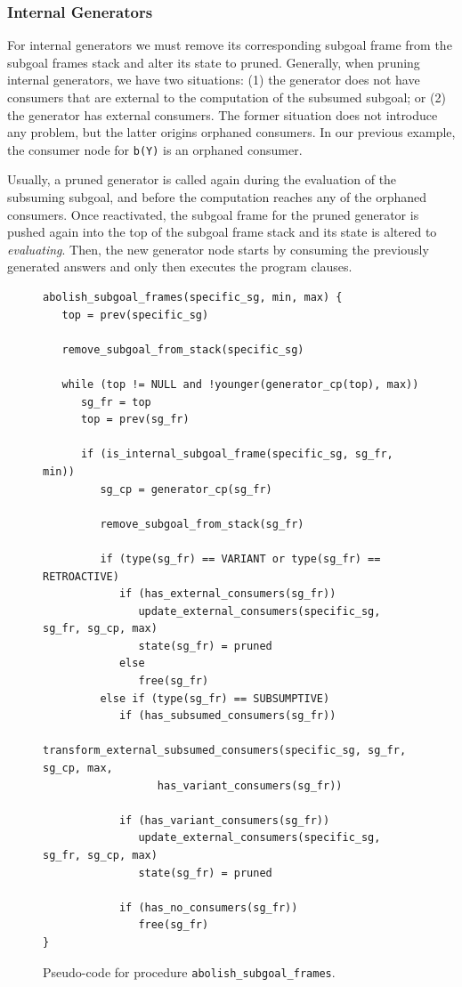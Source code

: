 \subsubsection{Internal Generators}

For internal generators we must remove its corresponding subgoal frame
from the subgoal frames stack and alter its state to pruned. Generally, when pruning internal generators, we
have two situations: (1) the generator does not have consumers that are external to the computation of the
subsumed subgoal; or (2) the generator has external consumers. The former situation does not introduce any
problem, but the latter origins orphaned consumers. In our previous example, the consumer node for \texttt{b(Y)} is
an orphaned consumer.

Usually, a pruned generator is called again during the evaluation of the subsuming subgoal, and before
the computation reaches any of the orphaned consumers. Once reactivated, the subgoal frame for the pruned
generator is pushed again into the top of the subgoal frame stack and its state is altered to
\textit{evaluating}. Then, the new generator node starts by consuming the previously generated answers
and only then executes the program clauses.

\begin{figure}[ht]
\begin{Verbatim}
abolish_subgoal_frames(specific_sg, min, max) {
   top = prev(specific_sg)

   remove_subgoal_from_stack(specific_sg)
   
   while (top != NULL and !younger(generator_cp(top), max))
      sg_fr = top
      top = prev(sg_fr)

      if (is_internal_subgoal_frame(specific_sg, sg_fr, min))
         sg_cp = generator_cp(sg_fr)
         
         remove_subgoal_from_stack(sg_fr)
         
         if (type(sg_fr) == VARIANT or type(sg_fr) == RETROACTIVE)
            if (has_external_consumers(sg_fr))
               update_external_consumers(specific_sg, sg_fr, sg_cp, max)
               state(sg_fr) = pruned
            else
               free(sg_fr)
         else if (type(sg_fr) == SUBSUMPTIVE)
            if (has_subsumed_consumers(sg_fr))
               transform_external_subsumed_consumers(specific_sg, sg_fr, sg_cp, max,
                  has_variant_consumers(sg_fr))
            
            if (has_variant_consumers(sg_fr))
               update_external_consumers(specific_sg, sg_fr, sg_cp, max)
               state(sg_fr) = pruned
               
            if (has_no_consumers(sg_fr))
               free(sg_fr)
}
\end{Verbatim}
\caption{Pseudo-code for procedure \texttt{abolish\_subgoal\_frames}.}
\label{fig:abolish_subgoal_frames}
\end{figure}

